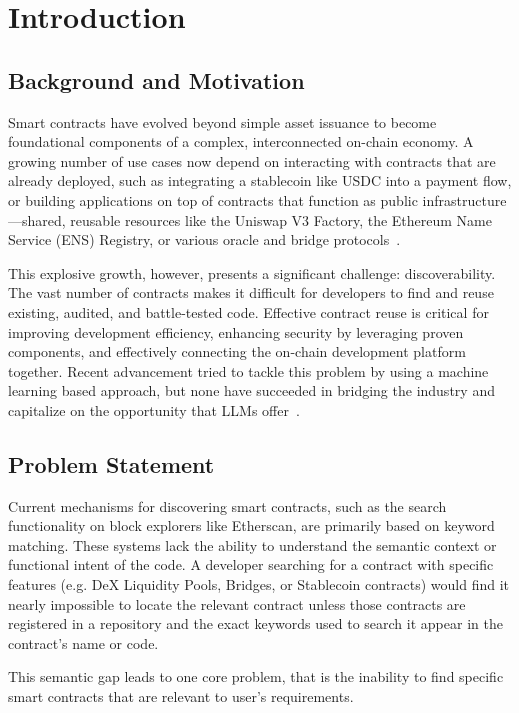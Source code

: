 
\section{Introduction}

\subsection{Background and Motivation}
Smart contracts have evolved beyond simple asset issuance to become foundational components of a complex, interconnected on-chain economy. A growing number of use cases now depend on interacting with contracts that are already deployed, such as integrating a stablecoin like USDC into a payment flow, or building applications on top of contracts that function as public infrastructure---shared, reusable resources like the Uniswap V3 Factory, the Ethereum Name Service (ENS) Registry, or various oracle and bridge protocols~\cite{b1}.

This explosive growth, however, presents a significant challenge: discoverability. The vast number of contracts makes it difficult for developers to find and reuse existing, audited, and battle-tested code. Effective contract reuse is critical for improving development efficiency, enhancing security by leveraging proven components, and effectively connecting the on-chain development platform together. Recent advancement tried to tackle this problem by using a machine learning based approach, but none have succeeded in bridging the industry and capitalize on the opportunity that LLMs offer~\cite{b3}.

\subsection{Problem Statement}
Current mechanisms for discovering smart contracts, such as the search functionality on block explorers like Etherscan, are primarily based on keyword matching. These systems lack the ability to understand the semantic context or functional intent of the code. A developer searching for a contract with specific features (e.g. DeX Liquidity Pools, Bridges, or Stablecoin contracts) would find it nearly impossible to locate the relevant contract unless those contracts are registered in a repository and the exact keywords used to search it appear in the contract's name or code.

This semantic gap leads to one core problem, that is the inability to find specific smart contracts that are relevant to user's requirements.


